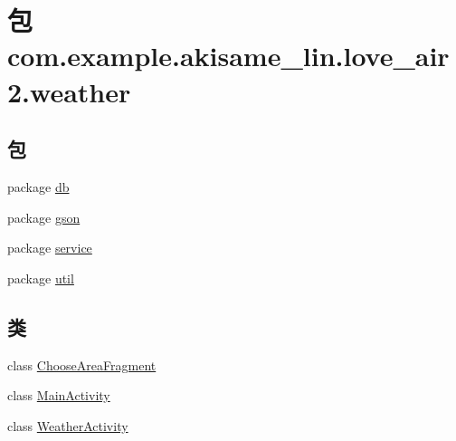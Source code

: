 \hypertarget{namespacecom_1_1example_1_1akisame__lin_1_1love__air2_1_1weather}{}\section{包 com.\+example.\+akisame\+\_\+lin.\+love\+\_\+air2.\+weather}
\label{namespacecom_1_1example_1_1akisame__lin_1_1love__air2_1_1weather}
\subsection*{包}
\begin{DoxyCompactItemize}
\item 
package \mbox{\hyperlink{namespacecom_1_1example_1_1akisame__lin_1_1love__air2_1_1weather_1_1db}{db}}
\item 
package \mbox{\hyperlink{namespacecom_1_1example_1_1akisame__lin_1_1love__air2_1_1weather_1_1gson}{gson}}
\item 
package \mbox{\hyperlink{namespacecom_1_1example_1_1akisame__lin_1_1love__air2_1_1weather_1_1service}{service}}
\item 
package \mbox{\hyperlink{namespacecom_1_1example_1_1akisame__lin_1_1love__air2_1_1weather_1_1util}{util}}
\end{DoxyCompactItemize}
\subsection*{类}
\begin{DoxyCompactItemize}
\item 
class \mbox{\hyperlink{classcom_1_1example_1_1akisame__lin_1_1love__air2_1_1weather_1_1_choose_area_fragment}{Choose\+Area\+Fragment}}
\item 
class \mbox{\hyperlink{classcom_1_1example_1_1akisame__lin_1_1love__air2_1_1weather_1_1_main_activity}{Main\+Activity}}
\item 
class \mbox{\hyperlink{classcom_1_1example_1_1akisame__lin_1_1love__air2_1_1weather_1_1_weather_activity}{Weather\+Activity}}
\end{DoxyCompactItemize}
